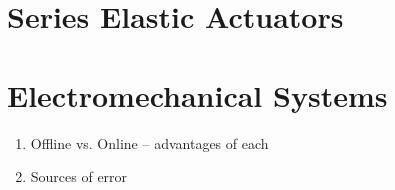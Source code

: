 \section{Series Elastic Actuators}

\section{Electromechanical Systems}

\begin{enumerate}
  \item Offline vs. Online -- advantages of each
  \item Sources of error
\end{enumerate}







